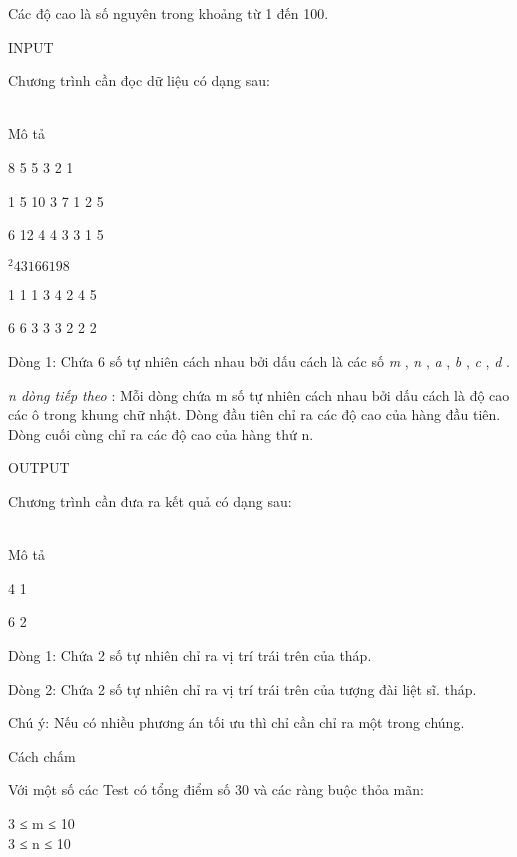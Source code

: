    Các độ cao là số nguyên trong khoảng từ 1 đến 100.        

       INPUT           

   Chương trình cần đọc dữ liệu có dạng sau:        


\\

       Mô tả                    

        8 5 5 3 2 1                       

        1 5 10 3 7 1 2    5                       

        6 12 4 4 3 3 1    5                       

$^         2 4 3 1 6 6 19 8        $

        1 1 1 3 4 2 4    5                       

        6 6 3 3 3 2 2    2       

               Dòng    1:                      Chứa 6              số    tự nhiên cách nhau bởi dấu cách là các số       \textit{         m        }       ,       \textit{        n       }       ,       \textit{        a       }       ,       \textit{        b       }       ,       \textit{         c        }       ,       \textit{        d       }       .                    

\textit{         n dòng tiếp theo        }        :                      Mỗi dòng chứa              m số tự nhiên cách nhau bởi    dấu cách là độ cao các ô trong khung chữ nhật.    Dòng đầu tiên chỉ ra các độ cao của hàng    đầu tiên. Dòng cuối cùng chỉ ra các độ cao    của hàng thứ n.                    



       OUTPUT           

   Chương trình cần đưa ra kết quả có dạng sau:        


\\

         Mô tả        

        4 1                       

        6 2       

         Dòng 1:                Chứa               2                 số tự    nhiên chỉ ra vị trí trái trên của tháp.        

         Dòng 2:                Chứa               2                 số tự    nhiên chỉ ra vị trí trái trên của tượng đài    liệt sĩ. tháp.        



       Chú ý:      Nếu có nhiều phương án tối ưu thì chỉ cần chỉ ra một trong chúng.        

       Cách chấm           

   Với một số các Test có tổng điểm số 30 và các ràng buộc thỏa mãn:        

   3 ≤ m ≤ 10         
\\   3 ≤ n ≤ 10  